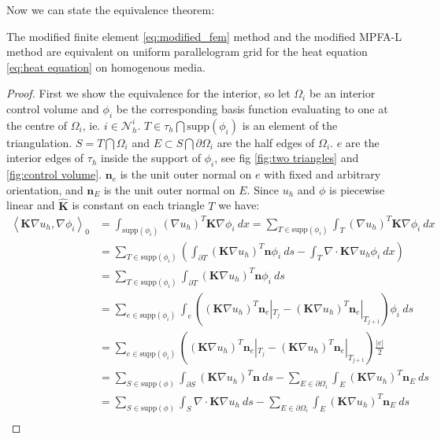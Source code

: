 \documentclass[../Main/main.tex]{subfiles}
\begin{document}
	Now we can state the equivalence theorem:
	\begin{theorem}
		The modified finite element \eqref{eq:modified_fem} method and the modified MPFA-L method are equivalent on uniform parallelogram grid for the heat equation \eqref{eq:heat equation} on homogenous media. 
	\end{theorem}

	\begin{proof}
		First we show the equivalence for the interior, so
		let $\Omega_i$ be an interior control volume and $\phi_i$ be the corresponding basis function evaluating to one at the centre of $\Omega_i$, ie. $i \in \mathcal{N}_h^i$. $T \in \tau_h \bigcap \text{supp}(\phi_i)$ is an element of the triangulation. $S=T\bigcap \Omega_i$ and $E \subset S\bigcap \partial \Omega_i$ are the half edges of $\Omega_i$. $e$ are the interior edges of $\tau_h$ inside the support of $\phi_i$, see fig \ref{fig:two triangles} and \ref{fig:control volume}. $\pmb{n}_e$ is the unit outer normal on $e$ with fixed and arbitrary orientation, and $\pmb{n}_E$ is the unit outer normal on $E$. Since $u_h$ and $\phi$ is piecewise linear and $\pmb{\hat{K}}$ is constant on each triangle $T$ we have:
		\begin{equation}\label{eq:big computation}
			\begin{aligned}
				\left \langle \pmb{K}\nabla u_h, \nabla \phi_i \right \rangle_0 &= \int_{\text{supp}(\phi_i)} (\nabla u_h)^T \pmb{K}\nabla \phi_i \ dx = \sum_{T\in \text{supp}(\phi_i)} \int_T (\nabla u_h)^T \pmb{K}\nabla \phi_i \ dx \\
				&= \sum_{T\in \text{supp}(\phi_i)} \left ( \int_{\partial T} (\pmb{K}\nabla u_h)^T \pmb{n}\phi_i \ ds-\int_T \nabla \cdot \pmb{K} \nabla u_h \phi_i \ dx \right ) \\
				&=\sum_{T\in \text{supp}(\phi_i)}\int_{\partial T} (\pmb{K}\nabla u_h)^T \pmb{n}\phi_i \ ds \\
				&= \sum_{e\in \text{supp}(\phi_i)} \int_e ((\pmb{K}\nabla u_h)^T \pmb{n}_e|_{T_{j}} - (\pmb{K}\nabla u_h)^T \pmb{n}_e|_{T_{j+1}})\phi_i \ ds\\
				&= \sum_{e\in \text{supp}(\phi_i)}
				((\pmb{K}\nabla u_h)^T \pmb{n}_e|_{T_{j}} - (\pmb{K}\nabla u_h)^T \pmb{n}_e|_{T_{j+1}}) \frac{|e|}{2}\\
				&=\sum_{S\in \text{supp}(\phi)}\int_{\partial S}  (\pmb{K}\nabla u_h)^T \pmb{n} \ ds - \sum_{E\in \partial \Omega_i}\int_E (\pmb{K}\nabla u_h)^T \pmb{n}_E \ ds\\
				&= \sum_{S\in \text{supp}(\phi)}\int_{ S} \nabla \cdot \pmb{K}\nabla u_h \ ds - \sum_{E\in \partial \Omega_i}\int_E (\pmb{K}\nabla u_h)^T \pmb{n}_E \ ds\\

\end{aligned}
\end{equation}
\end{proof}
\end{document}
